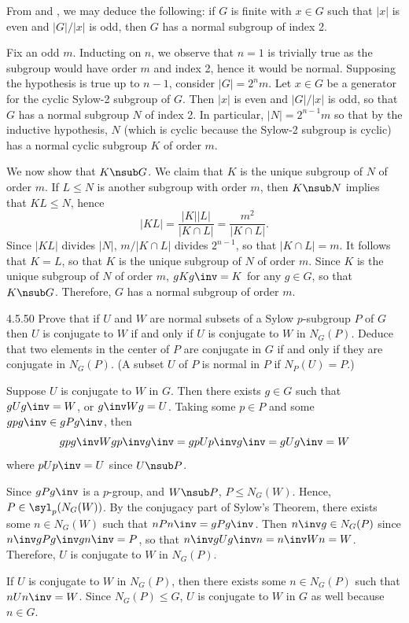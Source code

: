 \begin{sol}
	From  and , we may deduce the following: if $G$ is finite with $x \in G$ such that $|x|$ is even and $|G|/|x|$ is odd, then $G$ has a normal subgroup of index 2.

	Fix an odd $m$.
	Inducting on $n$, we observe that $n = 1$ is trivially true as the subgroup would have order $m$ and index 2, hence it would be normal.
	Supposing the hypothesis is true up to $n - 1$, consider $|G| = 2^nm$.
	Let $x \in G$ be a generator for the cyclic Sylow-2 subgroup of $G$.
	Then $|x|$ is even and $|G|/|x|$ is odd, so that $G$ has a normal subgroup $N$ of index 2.
	In particular, $|N| = 2^{n - 1}m$ so that by the inductive hypothesis, $N$ (which is cyclic because the Sylow-2 subgroup is cyclic) has a normal cyclic subgroup $K$ of order $m$.

	We now show that $K \nsub G$.
	We claim that $K$ is the unique subgroup of $N$ of order $m$.
	If $L \leq N$ is another subgroup with order $m$, then $K \nsub N$ implies that $KL \leq N$, hence
	\[
		|KL| = \frac{|K||L|}{|K \cap L|} = \frac{m^2}{|K \cap L|}.
	\]
	Since $|KL|$ divides $|N|$, $m/|K \cap L|$ divides $2^{n - 1}$, so that $|K \cap L| = m$.
	It follows that $K = L$, so that $K$ is the unique subgroup of $N$ of order $m$.
	Since $K$ is the unique subgroup of $N$ of order $m$, $gKg\inv = K$ for any $g \in G$, so that $K \nsub G$.
	Therefore, $G$ has a normal subgroup of order $m$.
\end{sol}

\begin{exercise}{4.5.50}
	Prove that if $U$ and $W$ are normal subsets of a Sylow $p$-subgroup $P$ of $G$ then $U$ is conjugate to $W$ if and only if $U$ is conjugate to $W$ in $N_G(P)$.
	Deduce that two elements in the center of $P$ are conjugate in $G$ if and only if they are conjugate in $N_G(P)$. (A subset $U$ of $P$ is normal in $P$ if $N_P(U) = P$.)
\end{exercise}

\begin{soliff}
	\rightimp Suppose $U$ is conjugate to $W$ in $G$.
	Then there exists $g \in G$ such that $gUg\inv = W$, or $g\inv Wg = U$.
	Taking some $p \in P$ and some $gpg\inv \in gPg\inv$, then
	\[
		gpg\inv W gp\inv g\inv = gpUp\inv g\inv = gUg\inv = W
	\]
	where $pUp\inv = U$ since $U \nsub P$.

	Since $gPg\inv$ is a $p$-group, and $W \nsub P$, $P \leq N_G(W)$.
	Hence, $P \in \syl_p(N_G(W))$.
	By the conjugacy part of Sylow's Theorem, there exists some $n \in N_G(W)$ such that $nPn\inv = gPg\inv$.
	Then $n\inv g \in N_G(P)$ since $n\inv gPg\inv gn\inv = P$, so that $n\inv gUg\inv n = n\inv Wn = W$.
	Therefore, $U$ is conjugate to $W$ in $N_G(P)$.

	\leftimp If $U$ is conjugate to $W$ in $N_G(P)$, then there exists some $n \in N_G(P)$ such that $nUn\inv = W$.
	Since $N_G(P) \leq G$, $U$ is conjugate to $W$ in $G$ as well because $n \in G$.
\end{soliff}

